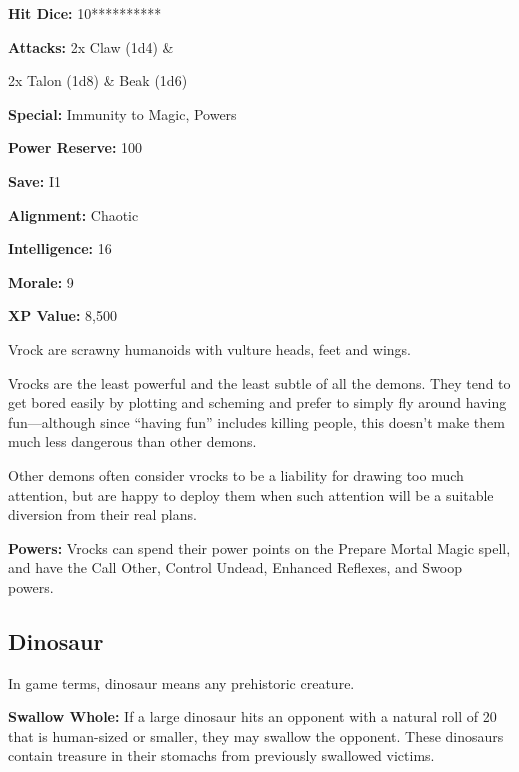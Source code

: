 \begin{multicols*}{2}
{\textbf{Hit Dice:} 10**********

\textbf{Attacks:} 2x Claw (1d4) \& 

2x Talon (1d8) \& Beak (1d6)

\textbf{Special:} Immunity to Magic, Powers

\textbf{Power Reserve:} 100

\textbf{Save:} I1

\textbf{Alignment:} Chaotic

\textbf{Intelligence:} 16

\textbf{Morale:} 9

\textbf{XP Value:} 8,500}

Vrock are scrawny humanoids with vulture heads, feet and wings.

Vrocks are the least powerful and the least subtle of all the demons. They tend to get bored easily by plotting and scheming and prefer to simply fly around having fun—although since “having fun” includes killing people, this doesn’t make them much less dangerous than other demons.

Other demons often consider vrocks to be a liability for drawing too much attention, but are happy to deploy them when such attention will be a suitable diversion from their real plans.

\textbf{Powers:} Vrocks can spend their power points on the Prepare Mortal Magic spell, and have the Call Other, Control Undead, Enhanced Reflexes, and Swoop powers.

\subsection{Dinosaur}
In game terms, dinosaur means any prehistoric creature.

\textbf{Swallow Whole:} If a large dinosaur hits an opponent with a natural roll of 20 that is human-sized or smaller, they may swallow the opponent. These dinosaurs contain treasure in their stomachs from previously swallowed victims.


\end{multicols*}
